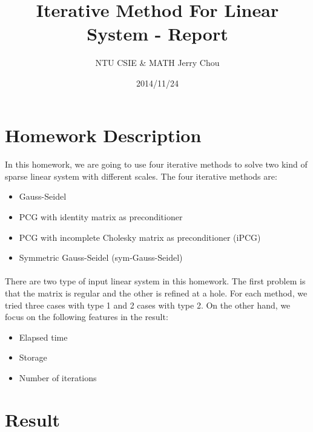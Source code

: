\documentclass{article}
\begin{document}
\title{Iterative Method For Linear System - Report}
\author{NTU CSIE \& MATH Jerry Chou}
\date{2014/11/24}
\maketitle

\section{Homework Description}
\paragraph{}
In this homework, we are going to use four iterative methods to solve two kind of sparse linear system with different scales. The four iterative methods are:
\begin{itemize}
\item Gauss-Seidel
\item PCG with identity matrix as preconditioner
\item PCG with incomplete Cholesky matrix as preconditioner (iPCG)
\item Symmetric Gauss-Seidel (sym-Gauss-Seidel)
\end{itemize}

\paragraph{}
There are two type of input linear system in this homework. The first problem is that the matrix is regular and the other is refined at a hole. For each method, we tried three cases with type 1 and 2 cases with type 2. On the other hand, we focus on the following features in the result:
\begin{itemize}
\item Elapsed time
\item Storage
\item Number of iterations
\end{itemize}


\newpage
\section{Result}
\end{document}
